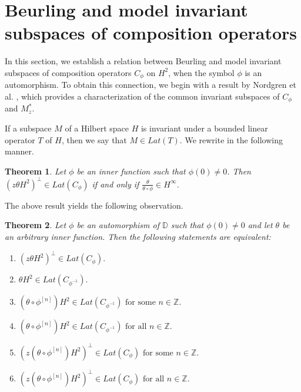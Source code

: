 \documentclass[12pt, reqno]{amsart}
\newtheorem{theorem}{Theorem}[section]
\theoremstyle{definition}
\numberwithin{equation}{section}
\begin{document}
		
		
\section{ Beurling and model invariant subspaces of composition operators}
In this section, we establish a relation between Beurling and model invariant subspaces of composition operators $ C_\phi$ on $H^2$, when the symbol $\phi$ is an automorphism. To obtain this connection, we begin with a result by Nordgren et al. \cite{COMP}, which provides a characterization of the common invariant subspaces of $C_\phi$ and $M_z^*$.  


 If a subspace $M$ of a Hilbert space $H$ is invariant under a bounded linear operator $T$ of $H$, then we say that $M\in Lat(T)$.
We rewrite \cite[Theorem 4.1]{COMP} in the following manner.

\begin{theorem}\cite[Theorem 4.1]{COMP}\label{inv}
	Let $\phi$ be an inner function such that $\phi(0)\neq 0$. Then  
	$(z\theta H^2)^\perp\in Lat(C_\phi)$ if and only if 
 $\frac{\theta}{\theta\circ \phi}\in H^\infty$.

\end{theorem}


The above result yields the following observation.

\begin{theorem}\label{main1}
	Let $\phi$ be an automorphism of $\mathbb{D}$ such that $\phi(0)\neq0$ and let $\theta$ be an arbitrary inner function. Then the following statements are equivalent:
	
	\begin{enumerate}
		\item   $(z\theta H^2)^\perp \in Lat(C_{\phi}).$ 
		\item   $\theta H^2 \in Lat(C_{\phi^{-1}}).$
	
		\item   $(\theta \circ \phi^{[n]}) H^2 \in Lat(C_{\phi^{-1}})\text{ for some } n \in \mathbb{Z}.$
		\item   $(\theta \circ \phi^{[n]}) H^2 \in Lat(C_{\phi^{-1}})\text{ for all } n \in \mathbb{Z}.$
		\item   $(z(\theta\circ\phi^{[n]}) H^2)^\perp \in Lat(C_{\phi})\text{ for some } n \in \mathbb{Z}.$
		\item   $(z(\theta\circ\phi^{[n]}) H^2)^\perp \in Lat(C_{\phi})\text{ for all } n \in \mathbb{Z}.$
\end{enumerate}                                                 \end{theorem}
\end{document}
